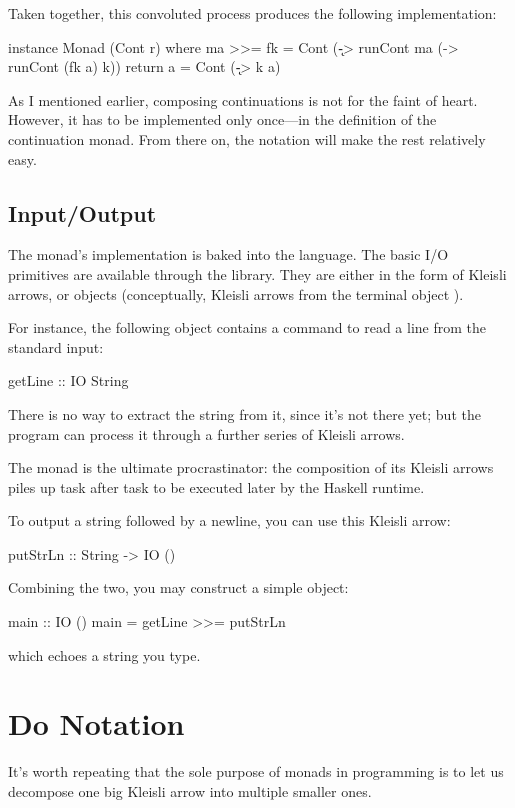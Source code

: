 \documentclass[DaoFP]{subfiles}
\begin{document}
Taken together, this convoluted process produces the following implementation:
\begin{haskell}
instance Monad (Cont r) where
  ma >>= fk = Cont (\k -> runCont ma (\a -> runCont (fk a) k))
  return a = Cont (\k -> k a)
\end{haskell}
As I mentioned earlier, composing continuations is not for the faint of heart. However, it has to be implemented only once---in the definition of the continuation monad. From there on, the  notation will make the rest relatively easy.

\subsection{Input/Output}

The  monad's implementation is baked into the language. The basic I/O primitives are available through the library. They are either in the form of Kleisli arrows, or  objects (conceptually, Kleisli arrows from the terminal object \hask{()}). 

For instance, the following object contains a command to read a line from the standard input:
\begin{haskell}
getLine :: IO String
\end{haskell}
There is no way to extract the string from it, since it's not there yet; but the program can process it through a further series of Kleisli arrows. 

The  monad is the ultimate procrastinator: the composition of its Kleisli arrows piles up task after task to be executed later by the Haskell runtime.

To output a string followed by a newline, you can use this Kleisli arrow:
\begin{haskell}
putStrLn :: String -> IO ()
\end{haskell}
Combining the two, you may construct a simple  object:
\begin{haskell}
main :: IO ()
main = getLine >>= putStrLn
\end{haskell}
which echoes a string you type.

\section{Do Notation}

It's worth repeating that the sole purpose of monads in programming is to let us decompose one big Kleisli arrow into multiple smaller ones. 
\end{document}
